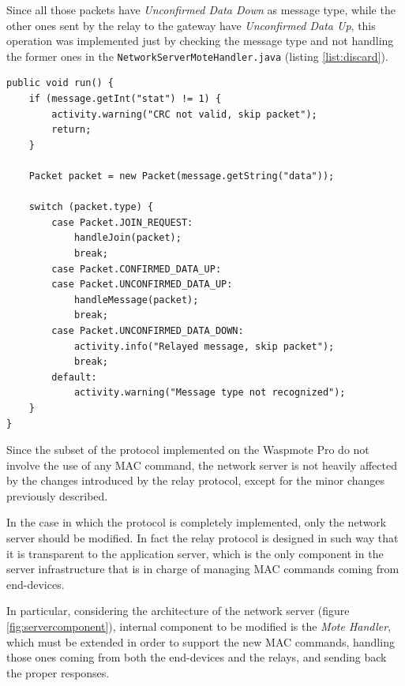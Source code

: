 Since all those packets have \emph{Unconfirmed Data Down} as message type, while the other ones sent by the relay to the gateway have \emph{Unconfirmed Data Up}, this operation was implemented just by checking the message type and not handling the former ones in the \texttt{NetworkServerMoteHandler.java} (listing \ref{list:discard}).


\begin{lstlisting}[caption=Discard fist hop packets\label{list:discard}]
public void run() {
    if (message.getInt("stat") != 1) {
        activity.warning("CRC not valid, skip packet");
        return;
    }

    Packet packet = new Packet(message.getString("data"));

    switch (packet.type) {
        case Packet.JOIN_REQUEST:
            handleJoin(packet);
            break;
        case Packet.CONFIRMED_DATA_UP:
        case Packet.UNCONFIRMED_DATA_UP:
            handleMessage(packet);
            break;
        case Packet.UNCONFIRMED_DATA_DOWN:
            activity.info("Relayed message, skip packet");
            break;
        default:
            activity.warning("Message type not recognized");
    }
}
\end{lstlisting}
Since the subset of the protocol implemented on the Waspmote Pro do not involve the use of any MAC command, the network server is not heavily affected by the changes introduced by the relay protocol, except for the minor changes previously described. 

In the case in which the protocol is completely implemented, only the network server should be modified. In fact the relay protocol is designed in such way that it is transparent to the application server, which is the only component in the server infrastructure that is in charge of managing MAC commands coming from end-devices.

In particular, considering the architecture of the network server (figure \ref{fig:servercomponent}), internal component to be modified is the \emph{Mote Handler}, which must be extended in order to support the new MAC commands, handling those ones coming from both the end-devices and the relays, and sending back the proper responses.




